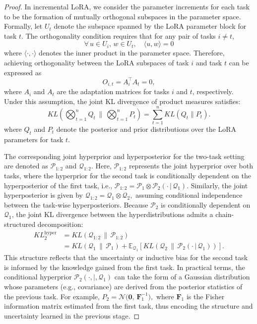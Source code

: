 \documentclass[letterpaper]{article} %
\begin{document}
\begin{proof}
In incremental LoRA, we consider the parameter increments for each task to be the formation of mutually orthogonal subspaces in the parameter space. Formally, let $U_t$ denote the subspace spanned by the LoRA parameter block for task $t$. The orthogonality condition requires that for any pair of tasks $i \neq t$,
$$ \forall\, u \in U_i,\, w \in U_t, \quad \langle u, w \rangle = 0$$
where $\langle \cdot, \cdot \rangle$ denotes the inner product in the parameter space. Therefore, achieving orthogonality between the LoRA subspaces of task $i$ and task $t$ can be expressed as
$${O}_{i,t} = A_i^{\top} A_t = 0,$$
where $A_i$ and $A_t$ are the adaptation matrices for tasks $i$ and $t$, respectively. Under this assumption, the joint KL divergence of product measures satisfies:   \begin{equation}
      KL\left(\bigotimes_{t=1}^n Q_t \, \bigg\| \, \bigotimes_{t=1}^n P_t\right) = \sum_{t=1}^n KL(Q_t \| P_t).
  \end{equation}
where $Q_t$ and $P_t$ denote the posterior and prior distributions over the LoRA parameters for task $t$.



The corresponding joint hyperprior and hyperposterior for the two-task setting are denoted as $\mathcal{P}_{1:2}$ and $\mathcal{Q}_{1:2}$. Here, $\mathcal{P}_{1:2}$ represents the joint hyperprior over both tasks, where the hyperprior for the second task is conditionally dependent on the hyperposterior of the first task, i.e.,
$\mathcal{P}_{1:2} = \mathcal{P}_1 \otimes \mathcal{P}_2(\cdot\,|\,\mathcal{Q}_1).$
Similarly, the joint hyperposterior is given by
$\mathcal{Q}_{1:2} = \mathcal{Q}_1 \otimes \mathcal{Q}_2,$
assuming conditional independence between the task-wise hyperposteriors. Because $\mathcal{P}_2$ is conditionally dependent on $\mathcal{Q}_1$, the joint KL divergence between the hyperdistributions admits a chain-structured decomposition:
\begin{equation}
\begin{aligned}
    KL^{\text{hyper}}_2&=KL(\mathcal{Q}_{1:2}\,\|\,\mathcal{P}_{1:2})  \\
    &= KL(\mathcal{Q}_1\,\|\,\mathcal{P}_1) + \mathbb{E}_{\mathcal{Q}_1}\left[ KL(\mathcal{Q}_2\,\|\,\mathcal{P}_2(\cdot\,|\,\mathcal{Q}_1)) \right].
\end{aligned}
\end{equation}
This structure reflects that the uncertainty or inductive bias for the second task is informed by the knowledge gained from the first task. In practical terms, the conditional hyperprior $\mathcal{P}_2(\cdot,|,\mathcal{Q}_1)$ can take the form of a Gaussian distribution whose parameters (e.g., covariance) are derived from the posterior statistics of the previous task. For example,
$P_2 = \mathcal{N}\big(\mathbf{0},\, \mathbf{F}_1^{-1}\big),$
where $\mathbf{F}_1$ is the Fisher information matrix estimated from the first task, thus encoding the structure and uncertainty learned in the previous stage.



\end{proof}
\end{document}
